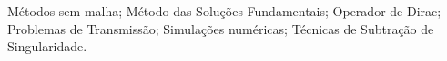 \acresetall
\noindent
Métodos sem malha; Método das Soluções Fundamentais; Operador de Dirac; Problemas de Transmissão; Simulações numéricas; Técnicas de Subtração de Singularidade.
